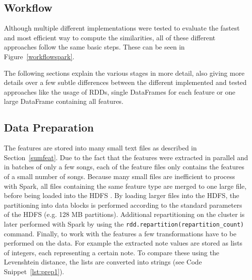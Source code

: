 \subsection{Workflow}

Although multiple different implementations were tested to evaluate the fastest and most efficient way to compute the similarities, all of these different approaches follow the same basic steps. These can be seen in Figure~\ref{workflowspark}.  

\begin{figure}[htbp]
	\centering
\end{figure}
\FloatBarrier

\noindent The following sections explain the various stages in more detail, also giving more details over a few subtle differences between the different implemented and tested approaches like the usage of RDDs, single DataFrames for each feature or one large DataFrame containing all features. 

\subsection{Data Preparation}

The features are stored into many small text files as described in Section~\ref{sumfeat}. Due to the fact that the features were extracted in parallel and in batches of only a few songs, each of the feature files only contains the features of a small number of songs. Because many small files are inefficient to process with Spark, all files containing the same feature type are merged to one large file, before being loaded into the HDFS \cite[p. 153]{sparkbook1}. By loading larger files into the HDFS, the partitioning into data blocks is performed according to the standard parameters of the HDFS (e.g. 128 MB partitions). Additional repartitioning on the cluster is later performed with Spark by using the \lstinline{rdd.repartition(repartition_count)} command. 
Finally, to work with the features a few transformations have to be performed on the data. For example the extracted note values are stored as lists of integers, each representing a certain note. To compare these using the Levenshtein distance, the lists are converted into strings (see Code Snippet~\ref{lst:prep1}). 

